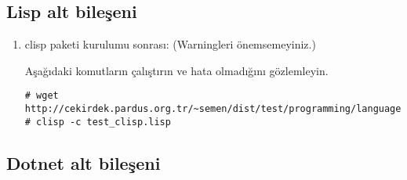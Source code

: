 \documentclass[a4paper,10pt]{article}
\begin{document}
\subsection{Lisp alt bileşeni}
\begin{enumerate}
 \item clisp paketi kurulumu sonrası: (Warningleri önemsemeyiniz.)

Aşağıdaki komutların çalıştırın ve hata olmadığını gözlemleyin.
\begin{verbatim}
# wget http://cekirdek.pardus.org.tr/~semen/dist/test/programming/language/lisp/test_clisp.lisp 
# clisp -c test_clisp.lisp
\end{verbatim}

\end{enumerate}
\subsection{Dotnet alt bileşeni}
\end{document}
